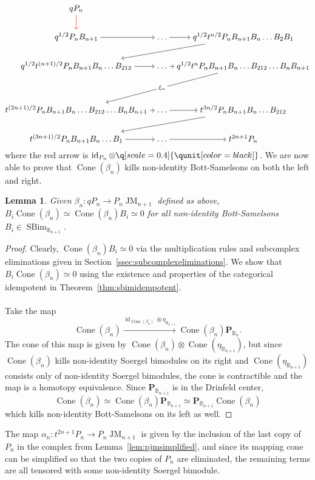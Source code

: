 \documentclass[11pt]{article}
\DeclareMathOperator{\Cone}{Cone}
\DeclareMathOperator{\id}{id}
\DeclareMathOperator{\SBim}{SBim}
\DeclareMathOperator{\JM}{JM}
\newtheorem{lemma}[thm]{Lemma}
\theoremstyle{definition}
\theoremstyle{remark}
\numberwithin{equation}{section}
\begin{document}
\[\begin{tikzcd}[ampersand replacement=\&,cramped,column sep=tiny]
	{qP_n} \&\& \\
	{q^{1/2}P_nB_{n+1}} \& \dots \& {q^{1/2}t^{n/2}P_nB_{n+1}B_n\dots B_2B_1} \\
	{q^{1/2}t^{(n+1)/2}P_nB_{n+1}B_n\dots B_{212}} \& \dots \& {q^{1/2}t^{n}P_nB_{n+1}B_n\dots B_{212}\dots B_{n}B_{n+1}} \\
	\\
	{t^{(2n+1)/2}P_nB_{n+1}B_n\dots B_{212}\dots B_{n}B_{n+1}} \& \dots \& {t^{3n/2}P_nB_{n+1}B_n\dots B_{212}} \\
	{t^{(3n+1)/2}P_nB_{n+1}B_n\dots B_1} \& \dots \& {t^{2n+1}P_n}
	\arrow[color=red, from=1-1, to=2-1]
	\arrow[from=2-1, to=2-2]
	\arrow[from=2-2, to=2-3]
	\arrow[from=2-3, to=3-1]
	\arrow[from=3-1, to=3-2]
	\arrow[from=3-2, to=3-3]
	\arrow["{\xi_n}"{description}, from=3-3, to=5-1]
	\arrow[from=5-1, to=5-2]
	\arrow[from=5-2, to=5-3]
	\arrow[from=5-3, to=6-1]
	\arrow[from=6-1, to=6-2]
	\arrow[from=6-2, to=6-3]
\end{tikzcd}\]
where the red arrow is $\id_{P_n}\otimes \q[scale=0.4]{\qunit[color=black]}$.
We are now able to prove that $\Cone(\beta_n)$ kills non-identity Bott-Samelsons on
both the left and right.
\begin{lemma}
	\label{lem:conebeta}
	Given $\beta_n:qP_n\to P_n\JM_{n+1}$ defined as above,
	$B_{i}\Cone(\beta_n)\simeq \Cone(\beta_n)B_i\simeq 0$ for all
	non-identity Bott-Samelsons $B_i\in\SBim_{\mathbb{B}_{n+1}}$.
\end{lemma}
\begin{proof}
Clearly, $\Cone(\beta_n)B_i\simeq 0 $ via the multiplication rules and
subcomplex eliminations given in Section~\ref{ssec:subcomplexeliminations}.
We show that $B_i\Cone(\beta_n)\simeq 0$ using the
existence
and properties of the categorical idempotent in Theorem~\ref{thm:sbimidempotent}.
\\ \\
Take the map \[\Cone(\beta_n) \xrightarrow{\id_{\Cone(\beta_n)}\otimes
\eta_{\mathbb{B}_{n+1}}} \Cone(\beta_n)\mathbf{P}_{\mathbb{B}_n}.\]
The cone of this map
is given by $\Cone(\beta_n)\otimes \Cone(\eta_{\mathbb{B}_{n+1}})$, but since
$\Cone(\beta_n)$ kills non-identity Soergel bimodules on its right and
$\Cone(\eta_{\mathbb{B}_{n+1}})$ consists only of non-identity Soergel bimodules, the
cone is contractible and the map is a homotopy equivalence. Since
$\mathbf{P}_{\mathbb{B}_{n+1}}$ is in the Drinfeld center,
\[\Cone(\beta_n)\simeq \Cone(\beta_n)\mathbf{P}_{\mathbb{B}_{n+1}}\simeq
\mathbf{P}_{\mathbb{B}_{n+1}}\Cone(\beta_n)\]
which kills non-identity Bott-Samelsons on its left as well.
\end{proof}
\noindent The map $\alpha_n:t^{2n+1}P_n \to P_n\JM_{n+1}$ is given by the inclusion 
of the last copy of $P_n$ in the complex
from Lemma~\ref{lem:pjmsimplified}, and since its mapping cone can be
simplified so that the two copies of $P_n$ are eliminated, the remaining
terms are all tensored with some non-identity Soergel bimodule.
\end{document}

